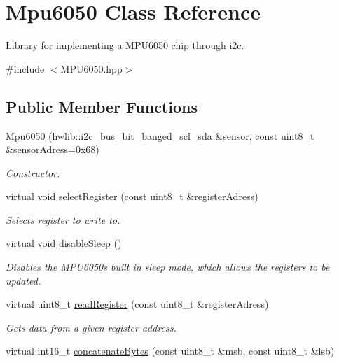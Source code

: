 \hypertarget{classMpu6050}{}\section{Mpu6050 Class Reference}
\label{classMpu6050}


Library for implementing a M\+P\+U6050 chip through i2c.  




{\ttfamily \#include $<$M\+P\+U6050.\+hpp$>$}

\subsection*{Public Member Functions}
\begin{DoxyCompactItemize}
\item 
\hyperlink{classMpu6050_af7beb7081101ae8d99452211c1d06789}{Mpu6050} (hwlib\+::i2c\+\_\+bus\+\_\+bit\+\_\+banged\+\_\+scl\+\_\+sda \&\hyperlink{classMpu6050_a03526c721c8d366b95d9c4cf9f19ef01}{sensor}, const uint8\+\_\+t \&sensor\+Adress=0x68)
\begin{DoxyCompactList}\small\item\em Constructor. \end{DoxyCompactList}\item 
virtual void \hyperlink{classMpu6050_a2ea5f53f3c5afec1c2a0fe55bf028599}{select\+Register} (const uint8\+\_\+t \&register\+Adress)
\begin{DoxyCompactList}\small\item\em Selects register to write to. \end{DoxyCompactList}\item 
virtual void \hyperlink{classMpu6050_a34c0508df81ca0f2dbcf9b6fba21148e}{disable\+Sleep} ()
\begin{DoxyCompactList}\small\item\em Disables the M\+P\+U6050\textquotesingle{}s built in sleep mode, which allows the registers to be updated. \end{DoxyCompactList}\item 
virtual uint8\+\_\+t \hyperlink{classMpu6050_a4a5c30be51cae90371221b41518cfd84}{read\+Register} (const uint8\+\_\+t \&register\+Adress)
\begin{DoxyCompactList}\small\item\em Gets data from a given register address. \end{DoxyCompactList}\item 
virtual int16\+\_\+t \hyperlink{classMpu6050_ae3064b01d13a3ec5288d490a94cf5109}{concatenate\+Bytes} (const uint8\+\_\+t \&msb, const uint8\+\_\+t \&lsb)

\end{DoxyCompactItemize}
